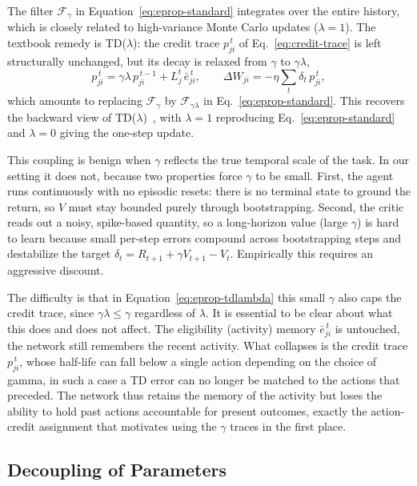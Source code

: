 The filter $\mathcal{F}_{\gamma}$
in Equation~\eqref{eq:eprop-standard} integrates over the entire history,
which is closely related to high-variance Monte Carlo updates ($\lambda = 1$). The textbook remedy is TD($\lambda$): the credit trace $p^{\,t}_{ji}$ of
Eq.~\eqref{eq:credit-trace} is left structurally unchanged, but its decay is
relaxed from $\gamma$ to $\gamma\lambda$,
\begin{equation}
p^{\,t}_{ji} = \gamma\lambda\, p^{\,t-1}_{ji} + L^t_j\, \bar{e}^{\,t}_{ji},
\qquad
\Delta W_{ji} = -\eta \sum_t \delta_t\, p^{\,t}_{ji},
\label{eq:eprop-tdlambda}
\end{equation}
which amounts to replacing $\mathcal{F}_\gamma$ by $\mathcal{F}_{\gamma\lambda}$
in Eq.~\eqref{eq:eprop-standard}. This recovers the backward view of
TD($\lambda$)~\citep{SuttonBarto2018}, with $\lambda = 1$ reproducing
Eq.~\eqref{eq:eprop-standard} and $\lambda = 0$ giving the one-step update.

This coupling is benign when $\gamma$ reflects the true temporal scale of the
task. In our setting it does not, because two properties force $\gamma$ to be
small. First, the agent runs continuously with no episodic resets: there is
no terminal state to ground the return, so $V$ must stay bounded purely
through bootstrapping. Second, the critic reads out a noisy, spike-based
quantity, so a long-horizon value (large $\gamma$) is hard to learn because small
per-step errors compound across bootstrapping steps and destabilize the
target $\delta_t = R_{t+1} + \gamma V_{t+1} - V_t$. Empirically this requires an
aggressive discount.

The difficulty is that in Equation~\eqref{eq:eprop-tdlambda} this small
$\gamma$ also caps the credit trace, since $\gamma\lambda \le \gamma$ 
regardless of $\lambda$. It is essential to be clear about what this
does and does not affect. The eligibility (activity) memory
$\bar{e}^{\,t}_{ji}$ is untouched, the network still remembers the recent activity. 
What collapses is the credit trace $p^{\,t}_{ji}$, 
whose half-life can fall below a single action depending on the choice of gamma, in such a case 
a TD error can no longer be matched to the actions that preceded. The network thus retains the memory of the activity but loses the ability to hold past
actions accountable for present outcomes, exactly the action-credit
assignment that motivates using the $\gamma$ traces in the first place.

\subsection{Decoupling of Parameters}
\label{sec:decoupled-lambda-rule}

